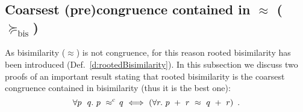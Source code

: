 
\subsection{Coarsest (pre)congruence contained in $\approx$ ($\succeq_{\mathrm{bis}}$)}
\label{s:coarsest}


As bisimilarity ($\approx$) is not congruence, for this reason rooted bisimilarity has been
introduced (Def.~\ref{d:rootedBisimilarity}).
In this subsection we discuss two proofs of an important result stating that
rooted bisimilarity is the coarsest congruence contained in
bisimilarity \cite{van2005characterisation,Gorrieri:2015jt,Mil89} (thus it
is the best one):
\begin{equation}
\label{eq:coarsest}
\forall p\ \ q.\ p\ \rapprox\ \! q\ \Longleftrightarrow\ ( \forall r.\ p\ +\
r\ \approx\ q\ +\ r )\enspace.
\end{equation}


